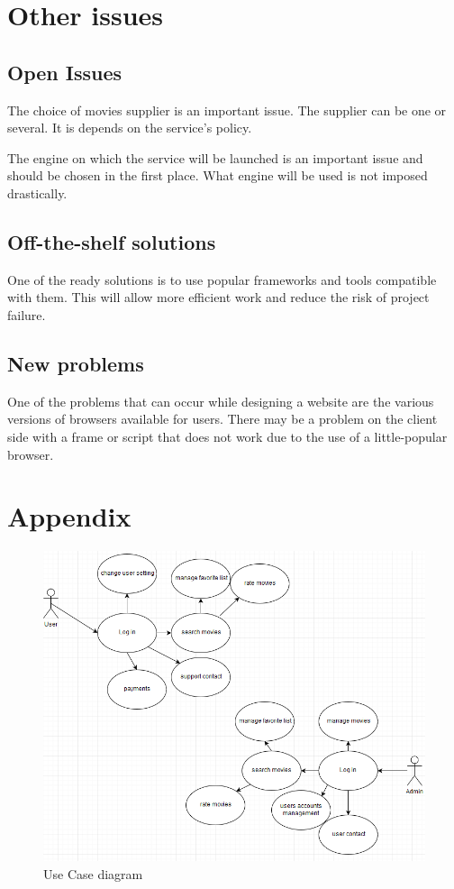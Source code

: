 \documentclass{scrreprt}
\begin{document}
\chapter{Other issues}

\section{Open Issues}
The choice of movies supplier is an important issue. The supplier can be one or several. It is depends on the service's policy.

The engine on which the service will be launched is an important issue and should be chosen in the first place. What engine will be used is not imposed drastically.

\section{Off-the-shelf solutions}

One of the ready solutions is to use popular frameworks and tools compatible with them. This will allow more efficient work and reduce the risk of project failure.

\section{New problems}

One of the problems that can occur while designing a website are the various versions of browsers available for users. There may be a problem on the client side with a frame or script that does not work due to the use of a little-popular browser.

\chapter {Appendix}

\begin{figure}[hp]
  \centering
  \includegraphics[width=1\textwidth]{img/usecase.PNG}
  \caption{Use Case diagram}
  \label{fig:Use case}
\end{figure}

\nocite{*}
\end{document}
